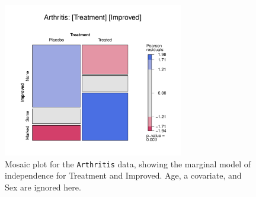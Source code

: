\documentclass[10pt,twoside]{article}\usepackage[]{graphicx}\usepackage[]{color}
\newcommand{\data}[1]{\texttt{#1}}
\begin{document}
\begin{figure}[htb]
\begin{center}
\includegraphics[width=0.7\textwidth]{fig/vcd-tut-Arthritis}
\caption{Mosaic plot for the \data{Arthritis} data, showing the marginal model of independence
	for Treatment and Improved.  Age, a covariate, and Sex are ignored here.}
\label{fig:arthritis}
\end{center}
\end{figure}
\end{document}
